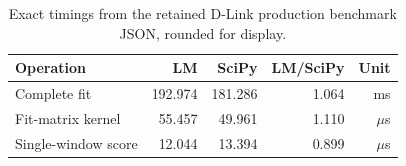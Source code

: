 \begin{table}[H]
\centering\small
\begin{tabular}{lrrrr}
\toprule
\textbf{Operation} & \textbf{LM} & \textbf{SciPy} & \textbf{LM/SciPy} & \textbf{Unit} \\
\midrule
Complete fit & 192.974 & 181.286 & 1.064 & ms \\
Fit-matrix kernel & 55.457 & 49.961 & 1.110 & $\mu$s \\
Single-window score & 12.044 & 13.394 & 0.899 & $\mu$s \\
\bottomrule
\end{tabular}
\caption{Exact timings from the retained D-Link production benchmark JSON, rounded for display.}
\label{tab:retained-backend}
\end{table}
